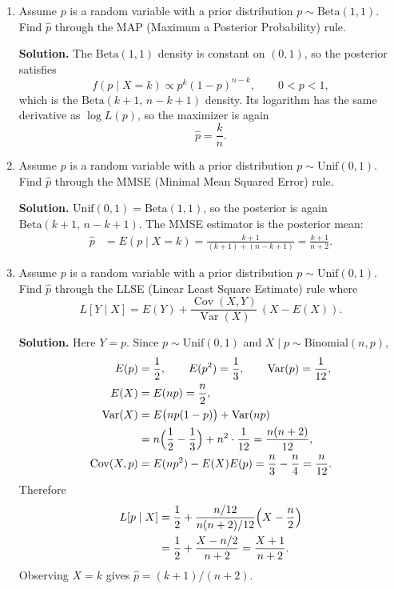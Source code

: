 \documentclass[11pt]{article}
\newcommand{\Var}{\operatorname{Var}}
\newcommand{\Cov}{\operatorname{Cov}}
\begin{document}
\begin{enumerate}[label=\arabic*., leftmargin=1.6em]
\begin{enumerate}
\textbf{Solution.}
\(X\mid p\sim\mathrm{Binomial}(n,p)\), so the likelihood is
\(L(p)=\binom{n}{k}p^{k}(1-p)^{n-k}\). For \(0<p<1\),
\begin{align*}
\frac{d}{dp}\log L(p)
&= \frac{k}{p}-\frac{n-k}{1-p}
= 0
\end{align*}
gives \(k(1-p)=(n-k)p\), hence \(\hat{p}=k/n\). The same value is the maximizer at the endpoints \(k=0\) and \(k=n\).

\item Assume $p$ is a random variable with a prior distribution $p\sim\mathrm{Beta}(1,1)$. Find $\hat{p}$
through the MAP (Maximum a Posterior Probability) rule.

\textbf{Solution.}
The \(\mathrm{Beta}(1,1)\) density is constant on \((0,1)\), so the posterior satisfies
\[
f(p\mid X=k)\propto p^{k}(1-p)^{n-k},
\qquad 0<p<1,
\]
which is the \(\mathrm{Beta}(k+1,\,n-k+1)\) density. Its logarithm has the same derivative as \(\log L(p)\), so the maximizer is again
\[
\hat{p}=\frac{k}{n}.
\]

\item Assume $p$ is a random variable with a prior distribution $p\sim\mathrm{Unif}(0,1)$. Find $\hat{p}$
through the MMSE (Minimal Mean Squared Error) rule.

\textbf{Solution.}
\(\mathrm{Unif}(0,1)=\mathrm{Beta}(1,1)\), so the posterior is again \(\mathrm{Beta}(k+1,\,n-k+1)\). The MMSE estimator is the posterior mean:
\begin{align*}
\hat{p}
&= E(p\mid X=k)
= \frac{k+1}{(k+1)+(n-k+1)}
= \frac{k+1}{n+2}.
\end{align*}

\item Assume $p$ is a random variable with a prior distribution $p\sim\mathrm{Unif}(0,1)$. Find $\hat{p}$
through the LLSE (Linear Least Square Estimate) rule where
\[
L[Y\mid X] = E(Y) + \frac{\Cov(X,Y)}{\Var(X)}\,(X-E(X)).
\]

\textbf{Solution.}
Here \(Y=p\). Since \(p\sim\mathrm{Unif}(0,1)\) and \(X\mid p\sim\mathrm{Binomial}(n,p)\),
\begin{align*}
E(p)
&= \frac{1}{2},
\qquad
E(p^{2})
= \frac{1}{3},
\qquad
\Var(p)
= \frac{1}{12}, \\
E(X)
&= E(np)
= \frac{n}{2}, \\
\Var(X)
&= E\bigl(np(1-p)\bigr)+\Var(np) \\
&= n\Bigl(\frac{1}{2}-\frac{1}{3}\Bigr)+n^{2}\cdot\frac{1}{12}
= \frac{n(n+2)}{12}, \\
\Cov(X,p)
&= E(np^{2})-E(X)E(p)
= \frac{n}{3}-\frac{n}{4}
= \frac{n}{12}.
\end{align*}
Therefore
\begin{align*}
L[p\mid X]
&= \frac{1}{2}+\frac{n/12}{n(n+2)/12}\Bigl(X-\frac{n}{2}\Bigr) \\
&= \frac{1}{2}+\frac{X-n/2}{n+2}
= \frac{X+1}{n+2}.
\end{align*}
Observing \(X=k\) gives \(\hat{p}=(k+1)/(n+2)\).
\end{enumerate}


\end{enumerate}
\end{document}
